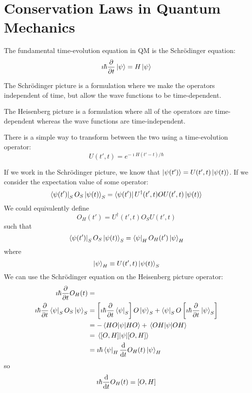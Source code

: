\documentclass[a4paper,twoside,master.tex]{subfiles}
\begin{document}
\section{Conservation Laws in Quantum Mechanics}
\label{sec:conservation_laws_in_quantum_mechanics}

The fundamental time-evolution equation in QM is the Schr\"odinger equation:
\begin{equation}
    \imath \hbar \pdv{t}\ket{\psi} = H\ket{\psi}
\end{equation}

The Schr\"odinger picture is a formulation where we make the operators independent of time, but allow the wave functions to be time-dependent.

The Heisenberg picture is a formulation where all of the operators are time-dependent whereas the wave functions are time-independent.

There is a simple way to transform between the two using a time-evolution operator:
\begin{equation}
    U(t',t) = e^{- \imath H(t'-t)/ \hbar}
\end{equation}

If we work in the Schr\"odinger picture, we know that $\ket{\psi(t')} = U(t',t)\ket{\psi(t)} $. If we consider the expectation value of some operator:
\begin{equation}
    \bra{\psi(t')}_S O_S\ket{\psi(t)}_S =\bra{\psi(t')} U^\dagger(t',t) O U(t',t)\ket{\psi(t)}
\end{equation}
We could equivalently define
\begin{equation}
    O_H(t') = U^\dagger(t',t) O_S U(t',t)
\end{equation}
such that
\begin{equation}
    \bra{\psi(t')}_S O_S\ket{\psi(t)}_S =\bra{\psi}_H O_H(t')\ket{\psi}_H
\end{equation}
where
\begin{equation}
    \ket{\psi}_H \equiv U(t',t)\ket{\psi(t)}_S
\end{equation}
We can use the Schr\"odinger equation on the Heisenberg picture operator:
\begin{align}
    \imath \hbar \pdv{t} O_H(t) &= \\
    \imath \hbar \pdv{t}\bra{\psi}_S O_S \ket{\psi}_S &= \left[ \imath \hbar \pdv{t}\bra{\psi}_S \right] O\ket{\psi}_S +\bra{\psi}_S O \left[ \imath \hbar \pdv{t}\ket{\psi}_S \right] \\
    &= -\ev{\psi}{HO} + \ev{\psi}{OH} \\
    &= \ev{\psi}{\comm{O}{H}} \\
    &= \imath \hbar\bra{\psi}_H \dv{t}O_H(t)\ket{\psi}_H
\end{align}
so
\begin{equation}
    \imath \hbar \dv{t}O_H(t) = \comm{O}{H}
\end{equation}
\end{document}
